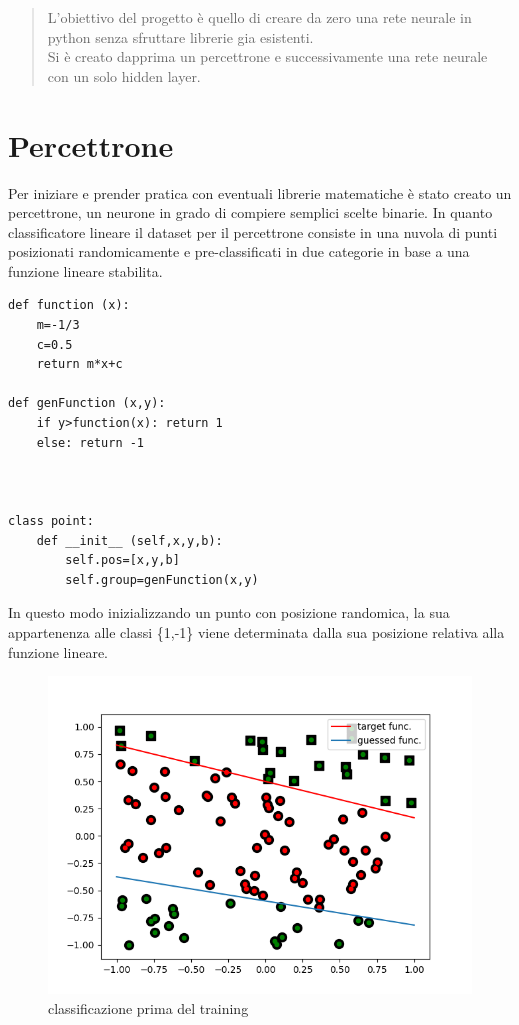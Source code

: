 \documentclass[12pt]{article}
\begin{document}
\begin{titlepage}
\end{titlepage}
\begin{abstract}
L'obiettivo del progetto è quello di creare da zero una rete neurale in python senza sfruttare librerie gia esistenti.
\\Si è creato dapprima un percettrone e successivamente una rete neurale con un solo hidden layer.
\end{abstract}
\section{Percettrone}
Per iniziare e prender pratica con eventuali librerie matematiche è stato creato un percettrone, un neurone in grado di compiere semplici scelte binarie.
In quanto classificatore lineare il dataset per il percettrone consiste in una nuvola di punti posizionati randomicamente e pre-classificati in due categorie in base a una funzione lineare stabilita.
\begin{lstlisting}[language=myPython]
def function (x):
	m=-1/3
	c=0.5
	return m*x+c

def genFunction (x,y):
	if y>function(x): return 1
	else: return -1



class point:
    def __init__ (self,x,y,b):
		self.pos=[x,y,b]
		self.group=genFunction(x,y)

\end{lstlisting}
In questo modo inizializzando un punto con posizione randomica, la sua appartenenza alle classi \{1,-1\} viene determinata dalla sua posizione relativa alla funzione lineare.
\newpage
\begin{figure}[h!]
	\centering
	\includegraphics[width=10 cm]{Perc_before.png}
	\caption{classificazione prima del training}
	\label{fig:percBefore}
\end{figure}
\end{document}
